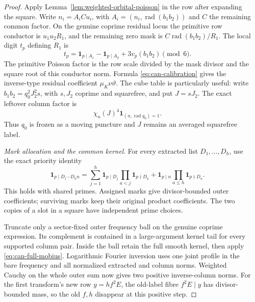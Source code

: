 \documentclass[11pt,a4paper]{article}
\numberwithin{equation}{section}
\theoremstyle{definition}
\theoremstyle{remark}
\newcommand{\rad}{\operatorname{rad}}
\begin{document}
\begin{proof}
Apply Lemma~\ref{lem:weighted-orbital-poisson} in the row after
expanding the square.  Write
$n_i=A_iCu_i$, with $A_i=(n_i,\rad(b_1b_2))$ and $C$ the remaining
common factor.  On the genuine coprime residual locus the primitive
row conductor is $u_1u_2R_1$, and the remaining zero mask is
$C\rad(b_1b_2)/R_1$.  The local digit $t_p$ defining $R_1$ is
\[
 t_p=\mathbf1_{p\mid A_1}-\mathbf1_{p\mid A_2}
                  +3v_p(b_1b_2)\pmod6.
\]
The primitive Poisson factor is the row scale divided by the mask
divisor and the square root of this conductor norm.  Formula
\eqref{eq:can-calibration} gives the inverse-type residual
coefficient $\mu_K\nu\vartheta$.
The cube table is particularly useful: write
$b_1b_2=q_0^2J_2^2s$, with $s,J_2$ coprime and squarefree, and put
$J=sJ_2$.  The exact leftover column factor is
\begin{equation}\label{eq:can-cube-factor}
 \chi_n(J)^4\mathbf1_{(n,\rad q_0)=1}.
\end{equation}
Thus $q_0$ is frozen as a moving puncture and $J$ remains an averaged
squarefree label.  

\smallskip\noindent\emph{Mark allocation and the common kernel.}
For every extracted list $D_1,\ldots,D_h$, use the exact priority
identity
\begin{equation}\label{eq:can-priority}
 \mathbf1_{p\mid D_1\cdots D_hn}
 =\sum_{j=1}^h\mathbf1_{p\mid D_j}\prod_{a<j}\mathbf1_{p\nmid D_a}
   +\mathbf1_{p\mid n}\prod_{a\le h}\mathbf1_{p\nmid D_a}.
\end{equation}
This holds with shared primes.  Assigned marks give divisor-bounded
outer coefficients; surviving marks keep their original product
coefficients.  The two copies of a slot in a square have independent
prime choices.

Truncate only a sector-fixed outer frequency ball on the genuine
coprime expression.  Its complement is contained in a large-argument
kernel tail for every supported column pair.  Inside the ball retain
the full smooth kernel, then apply \eqref{eq:can-full-mobius}.
Logarithmic Fourier inversion uses one joint profile in the bare
frequency and all normalized extracted and column norms.  Weighted
Cauchy on the whole outer sum now gives two positive inverse-column
norms.  For the first transform's new row $y=hf^2E$, the old-label
fibre $f^2E\mid y$ has divisor-bounded mass, so the old $f,h$ disappear
at this positive step.  


\end{proof}
\end{document}
